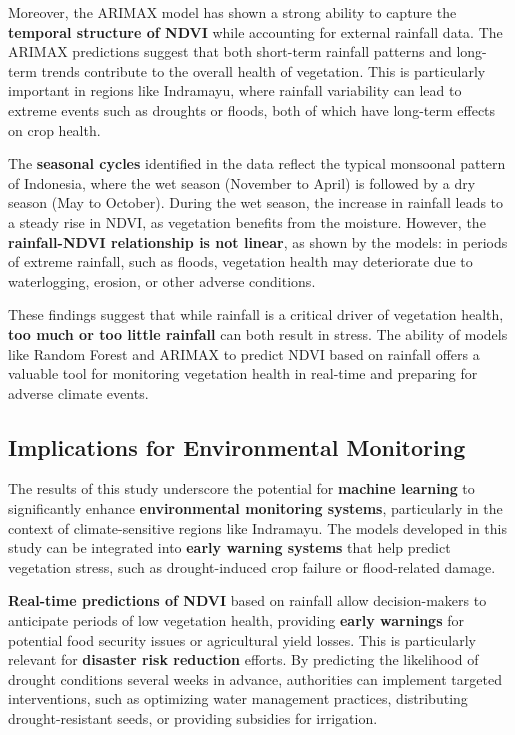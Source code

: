 \documentclass[
]{article}
\begin{document}
Moreover, the ARIMAX model has shown a strong ability to capture the
\textbf{temporal structure of NDVI} while accounting for external
rainfall data. The ARIMAX predictions suggest that both short-term
rainfall patterns and long-term trends contribute to the overall health
of vegetation. This is particularly important in regions like Indramayu,
where rainfall variability can lead to extreme events such as droughts
or floods, both of which have long-term effects on crop health.

The \textbf{seasonal cycles} identified in the data reflect the typical
monsoonal pattern of Indonesia, where the wet season (November to April)
is followed by a dry season (May to October). During the wet season, the
increase in rainfall leads to a steady rise in NDVI, as vegetation
benefits from the moisture. However, the \textbf{rainfall-NDVI
relationship is not linear}, as shown by the models: in periods of
extreme rainfall, such as floods, vegetation health may deteriorate due
to waterlogging, erosion, or other adverse conditions.

These findings suggest that while rainfall is a critical driver of
vegetation health, \textbf{too much or too little rainfall} can both
result in stress. The ability of models like Random Forest and ARIMAX to
predict NDVI based on rainfall offers a valuable tool for monitoring
vegetation health in real-time and preparing for adverse climate events.

\subsection{Implications for Environmental
Monitoring}\label{implications-for-environmental-monitoring}

The results of this study underscore the potential for \textbf{machine
learning} to significantly enhance \textbf{environmental monitoring
systems}, particularly in the context of climate-sensitive regions like
Indramayu. The models developed in this study can be integrated into
\textbf{early warning systems} that help predict vegetation stress, such
as drought-induced crop failure or flood-related damage.

\textbf{Real-time predictions of NDVI} based on rainfall allow
decision-makers to anticipate periods of low vegetation health,
providing \textbf{early warnings} for potential food security issues or
agricultural yield losses. This is particularly relevant for
\textbf{disaster risk reduction} efforts. By predicting the likelihood
of drought conditions several weeks in advance, authorities can
implement targeted interventions, such as optimizing water management
practices, distributing drought-resistant seeds, or providing subsidies
for irrigation.
\end{document}
